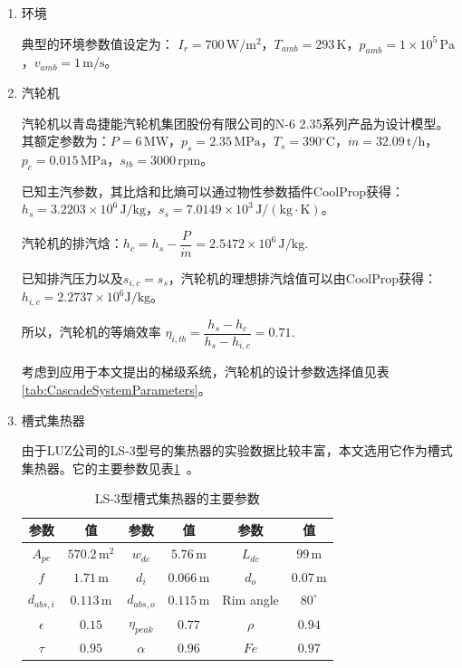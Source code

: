 \begin{enumerate}[label=(\arabic*)]

\item 环境

典型的环境参数值设定为：
$I_r = 700\,\mathrm{W/m^2}$，$T_{amb} = 293\,\mathrm{K}$，$p_{amb} = 1\times10^5\,\mathrm{Pa}$，$v_{amb} = 1\,\mathrm{m/s}$。

\item 汽轮机

汽轮机以青岛捷能汽轮机集团股份有限公司的N-6 2.35系列产品为设计模型。其额定参数为：$P = 6\,\mathrm{MW}$，$p_s = 2.35\,\mathrm{MPa}$，$T_s = 390\mathrm{^\circ C}$，$\dot{m} = 32.09\,\mathrm{t/h}$，$p_c = 0.015\,\mathrm{MPa}$，$s_{tb} = 3000\,\mathrm{rpm}$。
	
	已知主汽参数，其比焓和比熵可以通过物性参数插件CoolProp获得：$h_s = 3.2203\times10^6\,\mathrm{J/kg}$，$s_s = 7.0149\times10^3\,\mathrm{J/(kg\cdot K)}$。
	
	汽轮机的排汽焓：$h_{c} = h_{s} - \dfrac{P}{\dot{m}} = 2.5472\times10^6\,\mathrm{J/kg}$.
	
	已知排汽压力以及$s_{i,c} = s_s$，汽轮机的理想排汽焓值可以由CoolProp获得：$h_{i,c} = 2.2737\times10^6\mathrm{J/kg}$。
	
	所以，汽轮机的等熵效率
	$\eta_{i,tb} = \dfrac{h_s - h_c}{h_{s} - h_{i,c}} = 0.71$.
	
	考虑到应用于本文提出的梯级系统，汽轮机的设计参数选择值见表\ref{tab:CascadeSystemParameters}。
		 
\item 槽式集热器

由于LUZ公司的LS-3型号的集热器的实验数据比较丰富，本文选用它作为槽式集热器。它的主要参数见表\ref{tab:TroughParameters}~\cite{Fernandez2010}。

\begin{table}[htbp]
	\caption{LS-3型槽式集热器的主要参数}
	\begin{center}
	\begin{tabular}{cccccc}
		\toprule
		参数		&	值	&	参数		&	值	&	参数		&	值\\
		\midrule
		$A_{pc}$		&	$570.2\,\mathrm{m^2}$	&	$w_{dc}$	&	$5.76\,\mathrm{m}$	&	$L_{dc}$	&	$99\,\mathrm{m}$\\
		$f$	&	$1.71\,\mathrm{m}$	&	$d_i$		&	$0.066\,\mathrm{m}$	&	$d_o$	&	$0.07\,\mathrm{m}$\\
		$d_{abs,i}$	&	$0.113\,\mathrm{m}$	&	$d_{abs,o}$	&	$0.115\,\mathrm{m}$	&	Rim angle	&	$80^\circ$\\
		$\epsilon$		&	$0.15$	&	$\eta_{peak}$	&	$0.77$	&	$\rho$	&	$0.94$\\
		$\tau$	&	$0.95$	&	
$\alpha$	&	$0.96$	&	$Fe$	&	$0.97$\\
		\bottomrule
	\end{tabular}
	\end{center}
	\label{tab:TroughParameters}
\end{table}


\end{enumerate}
